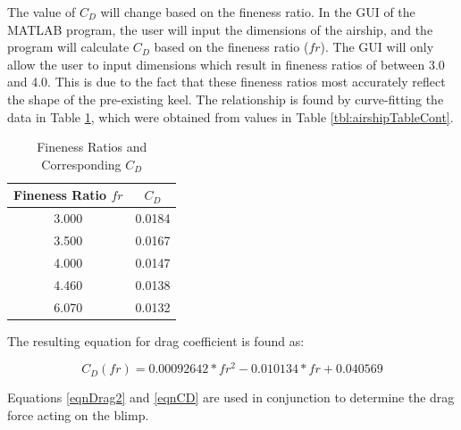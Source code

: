 \documentclass[../main.tex]{subfiles}
\begin{document}
The value of $C_D$ will change based on the fineness ratio. In the GUI of the MATLAB program, the user will input the dimensions of the airship, and the program will calculate $C_D$ based on the fineness ratio ($fr$). The GUI will only allow the user to input dimensions which result in fineness ratios of between 3.0 and 4.0. This is due to the fact that these fineness ratios most accurately reflect the shape of the pre-existing keel. The relationship is found by curve-fitting the data in Table \ref{tbl:finenessCoefficient}, which were obtained from values in Table \ref{tbl:airshipTableCont}.

\begin{table}[H]
	\caption{Fineness Ratios and Corresponding $C_D$}
	\label{tbl:finenessCoefficient}
\begin{center}
	\begin{tabular}{|c|c|}
	\hline 
	\textbf{Fineness Ratio $fr$} & \textbf{$C_D$} \\ 
	\hline 
	3.000 & 0.0184 \\ 
	\hline 
	3.500 & 0.0167 \\ 
	\hline 
	4.000 & 0.0147 \\ 
	\hline
	4.460 & 0.0138 \\ 
	\hline 
	6.070 & 0.0132 \\ 
	\hline  
\end{tabular} 
\end{center}
\end{table}

The resulting equation for drag coefficient is found as:

\begin{equation} \label{eqnCD}
	C_D(fr)= 0.00092642*fr^2 -0.010134*fr + 0.040569
\end{equation}

Equations \ref{eqnDrag2} and \ref{eqnCD} are used in conjunction to determine the drag force acting on the blimp.
\end{document}
